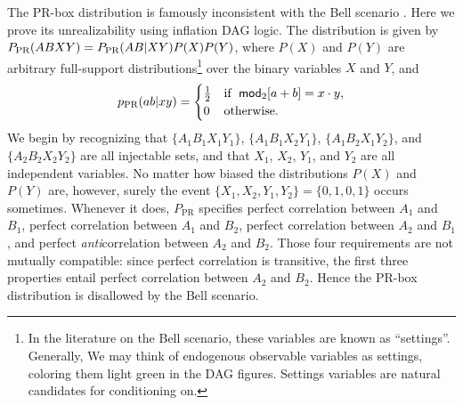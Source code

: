 The PR-box distribution is famously inconsistent with the Bell scenario \cite{PROriginal,PRUnit}. Here we prove its unrealizability using inflation DAG logic. The distribution  is given by ${P_{\text{PR}}}\parenths{A B X Y} = P_{\text{PR}}\parenths{A B | X Y} P(X) P(Y)$, where $P(X)$ and $P(Y)$ are arbitrary full-support distributions\footnote{In the literature on the Bell scenario, these variables are known as ``settings''. Generally, We may think of endogenous observable variables as settings, coloring them light green in the DAG figures. Settings variables are natural candidates for conditioning on.} over the binary variables $X$ and $Y$, and
\begin{align}\begin{split}\label{eq:PRbox}
p_{\text{PR}}\parens{a b |x y}=\begin{cases}\tfrac{1}{2}&\text{if }\; \SmallNamedFunction[2]{mod}{a+b}=x\cdot y, \\ 0&\text{otherwise}.\end{cases}
\end{split}\end{align}
We begin by recognizing that $\{A_1 B_1 X_1 Y_1\}$, $\{A_1 B_1 X_2 Y_1\}$, $\{A_1 B_2 X_1 Y_2\}$, and $\{A_2 B_2 X_2 Y_2\}$ are all injectable sets, and that $X_1$, $X_2$, $Y_1$, and $Y_2$ are all independent variables.
No matter how biased the distributions $P(X)$ and $P(Y)$ are, however, surely the event $\{X_1, X_2, Y_1, Y_2\}=\{0, 1, 0, 1\}$  occurs sometimes. Whenever it does, $P_{\text{PR}}$ specifies perfect correlation between $A_1$ and $B_1$, perfect correlation between $A_1$ and $B_2$, perfect correlation between $A_2$ and $B_1$, and perfect \emph{anti}correlation between $A_2$ and $B_2$. Those four requirements are not mutually compatible: since perfect correlation is transitive, the first three properties entail perfect correlation between $A_2$ and $B_2$. Hence the PR-box distribution is disallowed by the Bell scenario.

